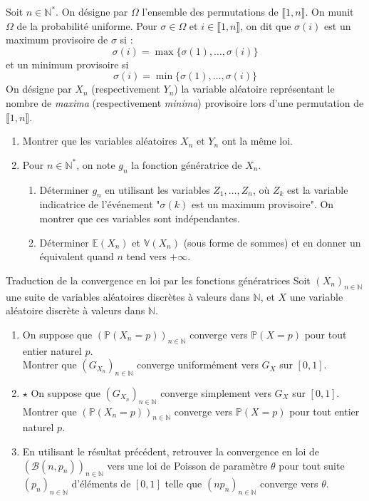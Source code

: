 \documentclass[french,a4paper]{article}
\renewcommand{\P}{\mathbb{P}}
\newcommand{\N}{\mathbb{N}}
\newcommand{\st}{^*}
\newcommand{\E}{\mathbb{E}}
\newcommand{\V}{\mathbb{V}}
\theoremstyle{plain}
\theoremstyle{definition}
\theoremstyle{remark}
\begin{document}
\begin{ex}[Moulin.71]{}
	Soit $n\in\N\st$. On désigne par $\Omega$ l'ensemble des permutations de $\llbracket1,n\rrbracket$. On munit $\Omega$ de la probabilité uniforme. Pour $\sigma\in\Omega$ et $i\in\llbracket1,n\rrbracket$, on dit que $\sigma(i)$ est un maximum provisoire de $\sigma$ si : $$\sigma(i)=\max\{\sigma(1),\ldots,\sigma(i)\}$$ et un minimum provisoire si $$\sigma(i)=\min\{\sigma(1),\ldots,\sigma(i)\}$$ On désigne par $X_n$ (respectivement $Y_n$) la variable aléatoire représentant le nombre de \textit{maxima} (respectivement \textit{minima}) provisoire lors d'une permutation de $\llbracket1,n\rrbracket$.
	\begin{enumerate}
		\item Montrer que les variables aléatoires $X_n$ et $Y_n$ ont la même loi.
		\item Pour $n\in\N\st$, on note $g_n$ la fonction génératrice de $X_n$.
		\begin{enumerate}[label=\alph*.]
			\item Déterminer $g_n$ en utilisant les variables $Z_1,\ldots,Z_n$, où $Z_k$ est la variable indicatrice de l'événement "$\sigma(k)$ est un maximum provisoire". On montrer que ces variables sont indépendantes.
			\item Déterminer $\E(X_n)$ et $\V(X_n)$ (sous forme de sommes) et en donner un équivalent quand $n$ tend vers $+\infty$.
		\end{enumerate}
	\end{enumerate}
\end{ex}

\begin{ex}[Moulin.72]{Traduction de la convergence en loi par les fonctions génératrices}
	Soit $(X_n)_{n\in\N}$ une suite de variables aléatoires discrètes à valeurs dans $\N$, et $X$ une variable aléatoire discrète à valeurs dans $\N$.
	\begin{enumerate}
		\item On suppose que $(\P(X_n=p))_{n\in\N}$ converge vers $\P(X=p)$ pour tout entier naturel $p$.\\
		Montrer que $(G_{X_n})_{n\in\N}$ converge uniformément vers $G_X$ sur $[0,1]$.
		\item $\star$ On suppose que $(G_{X_n})_{n\in\N}$ converge simplement vers $G_X$ sur $[0,1]$. \\ Montrer que $(\P(X_n=p))_{n\in\N}$ converge vers $\P(X=p)$ pour tout entier naturel $p$.
		\item En utilisant le résultat précédent, retrouver la convergence en loi de $(\mathcal{B}(n,p_n))_{n\in\N}$ vers une loi de Poisson de paramètre $\theta$ pour tout suite $(p_n)_{n\in\N}$ d'éléments de $[0,1]$ telle que $(np_n)_{n\in\N}$ converge vers $\theta$.
	\end{enumerate}
\end{ex}
\end{document}
